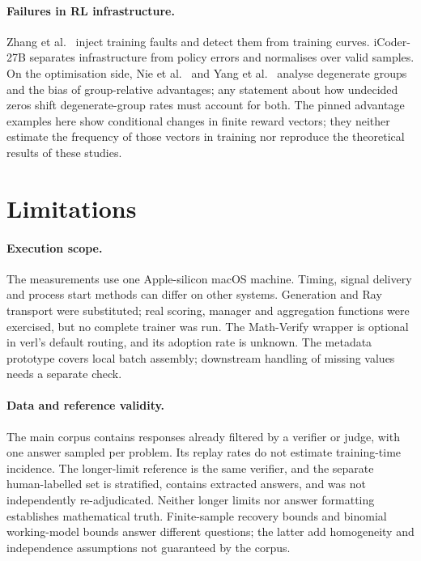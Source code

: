 \documentclass[10pt,a4paper]{article}
\let\cite\citep
\begin{document}
\paragraph{Failures in RL infrastructure.}
Zhang et al.\ \cite{zhang2026rftfailure} inject training faults and detect
them from training curves. iCoder-27B \cite{yang2026icoder} separates
infrastructure from policy errors and normalises over valid samples. On the
optimisation side, Nie et al.\ \cite{nie2026starvation} and Yang et al.\
\cite{yang2026biased} analyse degenerate groups and the bias of group-relative
advantages; any statement about how undecided zeros shift degenerate-group
rates must account for both. The pinned advantage examples here show
conditional changes in finite reward vectors; they neither estimate the
frequency of those vectors in training nor reproduce the theoretical
results of these studies.

\section{Limitations}
\label{sec:limitations}

\paragraph{Execution scope.}
The measurements use one Apple-silicon macOS machine. Timing, signal
delivery and process start methods can differ on other systems.
Generation and Ray transport were substituted; real scoring, manager
and aggregation functions were exercised, but no complete trainer was
run. The Math-Verify wrapper is optional in verl's default routing, and
its adoption rate is unknown. The metadata prototype covers local batch
assembly; downstream handling of missing values needs a separate check.

\paragraph{Data and reference validity.}
The main corpus contains responses already filtered by a verifier or
judge, with one answer sampled per problem. Its replay rates do not
estimate training-time incidence. The longer-limit reference is the
same verifier, and the separate human-labelled set is stratified,
contains extracted answers, and was not independently re-adjudicated.
Neither longer limits nor answer formatting establishes mathematical
truth. Finite-sample recovery bounds and binomial working-model bounds
answer different questions; the latter add homogeneity and independence
assumptions not guaranteed by the corpus.
\end{document}
